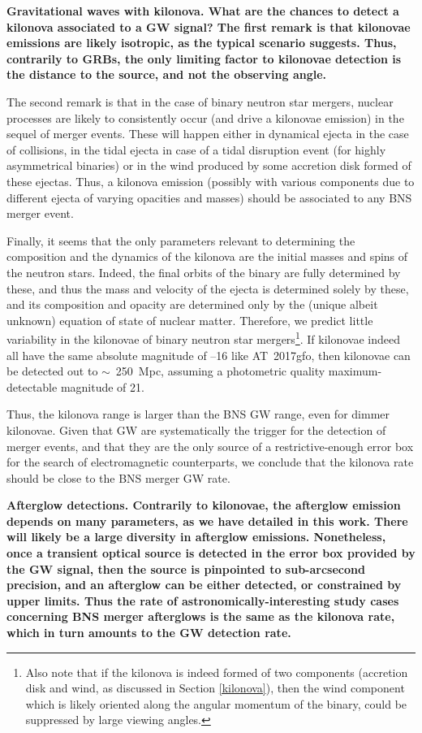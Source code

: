 \bf{Gravitational waves with kilonova. }What are the chances to detect a kilonova associated to a GW signal? The first remark is that kilonovae emissions are likely isotropic, as the typical scenario suggests. Thus, contrarily to GRBs, the only limiting factor to kilonovae detection is the distance to the source, and not the observing angle.

The second remark is that in the case of binary neutron star mergers, nuclear processes are likely to consistently occur (and drive a kilonovae emission) in the sequel of merger events. These will happen either in dynamical ejecta in the case of collisions, in the tidal ejecta in case of a tidal disruption event (for highly asymmetrical binaries) or in the wind produced by some accretion disk formed of these ejectas. Thus, a kilonova emission (possibly with various components due to different ejecta of varying opacities and masses) should be associated to any BNS merger event.

Finally, it seems that the only parameters relevant to determining the composition and the dynamics of the kilonova are the initial masses and spins of the neutron stars. Indeed, the final orbits of the binary are fully determined by these, and thus the mass and velocity of the ejecta is determined solely by these, and its composition and opacity are determined only by the (unique albeit unknown) equation of state of nuclear matter. Therefore, we predict little variability in the kilonovae of binary neutron star mergers\footnote{Also note that if the kilonova is indeed formed of two components (accretion disk and wind, as discussed in Section \ref{kilonova}), then the wind component which is likely oriented along the angular momentum of the binary, could be suppressed by large viewing angles.}. If kilonovae indeed all have the same absolute magnitude of --16 like AT~2017gfo, then kilonovae can be detected out to $\sim$~250~Mpc, assuming a photometric quality maximum-detectable magnitude of 21.

Thus, the kilonova range is larger than the BNS GW range, even for dimmer kilonovae. Given that GW are systematically the trigger for the detection of merger events, and that they are the only source of a restrictive-enough error box for the search of electromagnetic counterparts, we conclude that the kilonova rate should be close to the BNS merger GW rate.

\bf{Afterglow detections. }Contrarily to kilonovae, the afterglow emission depends on many parameters, as we have detailed in this work. There will likely be a large diversity in afterglow emissions. Nonetheless, once a transient optical source is detected in the error box provided by the GW signal, then the source is pinpointed to sub-arcsecond precision, and an afterglow can be either detected, or constrained by upper limits. Thus the rate of astronomically-interesting study cases concerning BNS merger afterglows is the same as the kilonova rate, which in turn amounts to the GW detection rate.


